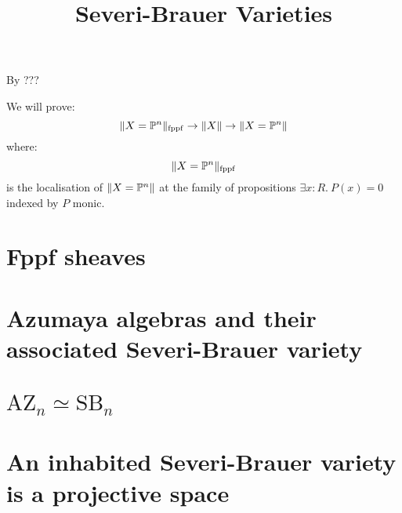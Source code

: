 \documentclass{../util/zariski}
\title{Severi-Brauer Varieties}
\newcommand{\SB}{\mathrm{SB}}
\newcommand{\AZ}{\mathrm{AZ}}
\begin{document}
\maketitle

By ???

We will prove:
\[\lVert X=\mathbb{P}^n \rVert_{\mathrm{fppf}} \to \lVert X \rVert \to \lVert X=\mathbb{P}^n \rVert\]
where:
\[\lVert X=\mathbb{P}^n \rVert_{\mathrm{fppf}}\]
is the localisation of $\lVert X=\mathbb{P}^n \rVert$ at the family of propositions $\exists x:R.\ P(x)=0$ indexed by $P$ monic.
\tableofcontents

\section{Fppf sheaves}


\section{Azumaya algebras and their associated Severi-Brauer variety}


\section{$\AZ_n\simeq \SB_n$}


\section{An inhabited Severi-Brauer variety is a projective space}


\printindex

\printbibliography
\end{document}
